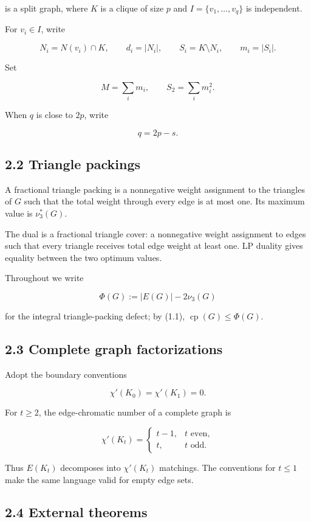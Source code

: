 \documentclass[
  11pt,
]{article}
\begin{document}
is a split graph, where \(K\) is a clique of size \(p\) and \(I=\{v_1,\ldots,v_q\}\) is independent.

For \(v_i\in I\), write

\[
N_i=N(v_i)\cap K,
\qquad
d_i=|N_i|,
\qquad
S_i=K\setminus N_i,
\qquad
m_i=|S_i|.
\]

Set

\[
M=\sum_i m_i,
\qquad
S_2=\sum_i m_i^2.
\]

When \(q\) is close to \(2p\), write

\[
q=2p-s.
\tag{2.1}
\]

\subsection{2.2 Triangle packings}\label{triangle-packings}

A fractional triangle packing is a nonnegative weight assignment to the triangles of \(G\) such that the total weight through every edge is at most one. Its maximum value is \(\nu_3^*(G)\).

The dual is a fractional triangle cover: a nonnegative weight assignment to edges such that every triangle receives total edge weight at least one. LP duality gives equality between the two optimum values.

Throughout we write

\[
\Phi(G):=|E(G)|-2\nu_3(G)
\]

for the integral triangle-packing defect; by (1.1), \(\operatorname{cp}(G)\le\Phi(G)\).

\subsection{2.3 Complete graph factorizations}\label{complete-graph-factorizations}

Adopt the boundary conventions

\[
\chi'(K_0)=\chi'(K_1)=0.
\]

For \(t\ge2\), the edge-chromatic number of a complete graph is

\[
\chi'(K_t)
=
\begin{cases}
t-1,&t\text{ even},\\
t,&t\text{ odd}.
\end{cases}
\tag{2.2}
\]

Thus \(E(K_t)\) decomposes into \(\chi'(K_t)\) matchings. The conventions for \(t\le1\) make the same language valid for empty edge sets.

\subsection{2.4 External theorems}\label{external-theorems}
\end{document}
